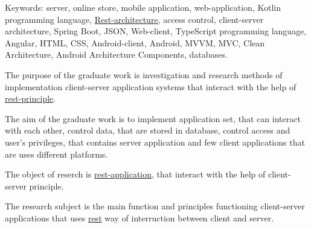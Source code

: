 Keywords: server, online store, mobile application, web-application, Kotlin programming language, \hyperlink{gloss:rest}{Rest-architecture}, 
access control, client-server architecture, Spring Boot, JSON, Web-client, TypeScript programming language, Angular, HTML, CSS, Android-client, 
Android, MVVM, MVC, Clean Architecture, Android Architecture Components, databases.

The purpose of the graduate work is investigation and research methods of implementation client-server application systems that interact with the help of \hyperlink{gloss:rest}{rest-principle}.

The aim of the graduate work is to implement application set, that can interact with each other, 
control data, that are stored in database, control access and user's privileges, 
that contains server application and few client applications that are uses different platforms.

The object of reserch is \hyperlink{gloss:rest}{rest-application}, that interact with the help of client-server principle.

The research subject is the main function and principles functioning client-server applications that uses \hyperlink{gloss:rest}{rest} way of interruction between client and server.